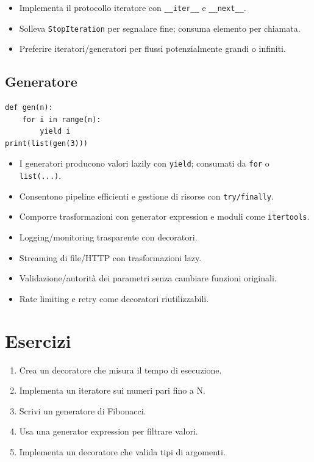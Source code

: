 \begin{tcolorbox}[title=Spiegazione]
\begin{itemize}
  \item Implementa il protocollo iteratore con \verb|__iter__| e \verb|__next__|.
  \item Solleva \texttt{StopIteration} per segnalare fine; consuma elemento per chiamata.
  \item Preferire iteratori/generatori per flussi potenzialmente grandi o infiniti.
\end{itemize}
\end{tcolorbox}

\subsection{Generatore}
\begin{lstlisting}
def gen(n):
    for i in range(n):
        yield i
print(list(gen(3)))
\end{lstlisting}

\begin{tcolorbox}[title=Spiegazione]
\begin{itemize}
  \item I generatori producono valori lazily con \texttt{yield}; consumati da \texttt{for} o \texttt{list(...)}.
  \item Consentono pipeline efficienti e gestione di risorse con \verb|try/finally|.
  \item Comporre trasformazioni con generator expression e moduli come \texttt{itertools}.
\end{itemize}
\end{tcolorbox}

\begin{tcolorbox}[title=Casi d'uso]
\begin{itemize}
  \item Logging/monitoring trasparente con decoratori.
  \item Streaming di file/HTTP con trasformazioni lazy.
  \item Validazione/autorità dei parametri senza cambiare funzioni originali.
  \item Rate limiting e retry come decoratori riutilizzabili.
\end{itemize}
\end{tcolorbox}

\section{Esercizi}
\begin{enumerate}
  \item Crea un decoratore che misura il tempo di esecuzione.
  \item Implementa un iteratore sui numeri pari fino a N.
  \item Scrivi un generatore di Fibonacci.
  \item Usa una generator expression per filtrare valori.
  \item Implementa un decoratore che valida tipi di argomenti.
\end{enumerate}

